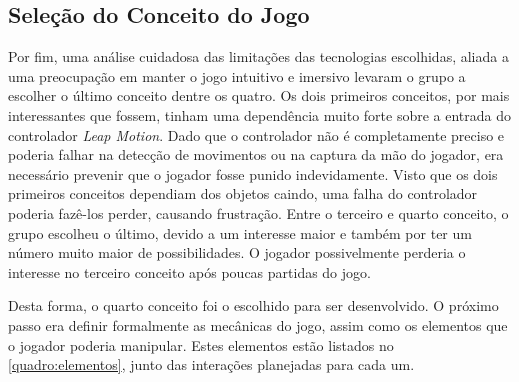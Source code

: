 \subsection{Seleção do Conceito do Jogo}\label{subsec-selecao-conceito}

Por fim, uma análise cuidadosa das limitações das tecnologias escolhidas, aliada 
a uma preocupação em manter o jogo intuitivo e imersivo levaram o grupo a 
escolher o último conceito dentre os quatro. Os dois primeiros conceitos, por 
mais interessantes que fossem, tinham uma dependência muito forte sobre a
entrada do controlador \textit{Leap Motion}. Dado que o controlador não 
é completamente preciso e poderia falhar na detecção de movimentos ou 
na captura da mão do jogador, era necessário prevenir que o jogador fosse
punido indevidamente.
Visto que os dois primeiros conceitos dependiam dos objetos caindo, 
uma falha do controlador poderia fazê-los perder, causando frustração. 
Entre o terceiro e quarto conceito, o grupo escolheu o último, devido a 
um interesse maior e também por ter um número muito maior de 
possibilidades. O jogador possivelmente perderia o interesse no terceiro 
conceito após poucas partidas do jogo.

Desta forma, o quarto conceito foi o escolhido para ser desenvolvido. 
O próximo passo era definir formalmente as mecânicas do jogo, 
assim como os elementos que o jogador poderia manipular. Estes 
elementos estão listados no \autoref{quadro:elementos}, junto das 
interações planejadas para cada um.

